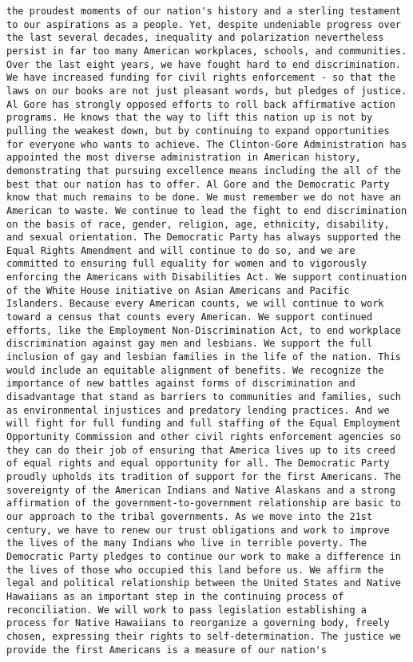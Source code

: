 \documentclass[
]{article}
\begin{document}
\begin{verbatim}
the proudest moments of our nation's history and a sterling testament to our aspirations as a people. Yet, despite undeniable progress over the last several decades, inequality and polarization nevertheless persist in far too many American workplaces, schools, and communities. Over the last eight years, we have fought hard to end discrimination. We have increased funding for civil rights enforcement - so that the laws on our books are not just pleasant words, but pledges of justice. Al Gore has strongly opposed efforts to roll back affirmative action programs. He knows that the way to lift this nation up is not by pulling the weakest down, but by continuing to expand opportunities for everyone who wants to achieve. The Clinton-Gore Administration has appointed the most diverse administration in American history, demonstrating that pursuing excellence means including the all of the best that our nation has to offer. Al Gore and the Democratic Party know that much remains to be done. We must remember we do not have an American to waste. We continue to lead the fight to end discrimination on the basis of race, gender, religion, age, ethnicity, disability, and sexual orientation. The Democratic Party has always supported the Equal Rights Amendment and will continue to do so, and we are committed to ensuring full equality for women and to vigorously enforcing the Americans with Disabilities Act. We support continuation of the White House initiative on Asian Americans and Pacific Islanders. Because every American counts, we will continue to work toward a census that counts every American. We support continued efforts, like the Employment Non-Discrimination Act, to end workplace discrimination against gay men and lesbians. We support the full inclusion of gay and lesbian families in the life of the nation. This would include an equitable alignment of benefits. We recognize the importance of new battles against forms of discrimination and disadvantage that stand as barriers to communities and families, such as environmental injustices and predatory lending practices. And we will fight for full funding and full staffing of the Equal Employment Opportunity Commission and other civil rights enforcement agencies so they can do their job of ensuring that America lives up to its creed of equal rights and equal opportunity for all. The Democratic Party proudly upholds its tradition of support for the first Americans. The sovereignty of the American Indians and Native Alaskans and a strong affirmation of the government-to-government relationship are basic to our approach to the tribal governments. As we move into the 21st century, we have to renew our trust obligations and work to improve the lives of the many Indians who live in terrible poverty. The Democratic Party pledges to continue our work to make a difference in the lives of those who occupied this land before us. We affirm the legal and political relationship between the United States and Native Hawaiians as an important step in the continuing process of reconciliation. We will work to pass legislation establishing a process for Native Hawaiians to reorganize a governing body, freely chosen, expressing their rights to self-determination. The justice we provide the first Americans is a measure of our nation's 
\end{verbatim}
\end{document}
